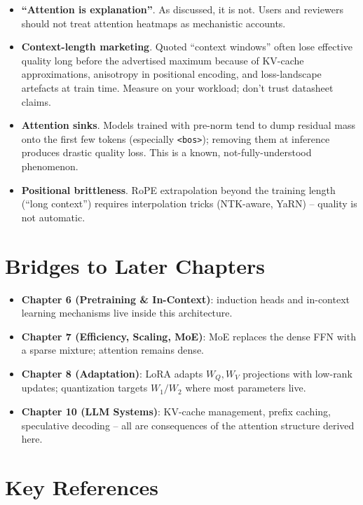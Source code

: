 \begin{itemize}
  \item \textbf{``Attention is explanation''}. As discussed, it is
        not. Users and reviewers should not treat attention heatmaps
        as mechanistic accounts.
  \item \textbf{Context-length marketing}. Quoted ``context windows''
        often lose effective quality long before the advertised
        maximum because of KV-cache approximations, anisotropy in
        positional encoding, and loss-landscape artefacts at train
        time. Measure on your workload; don't trust datasheet claims.
  \item \textbf{Attention sinks}. Models trained with pre-norm tend
        to dump residual mass onto the first few tokens (especially
        \texttt{<bos>}); removing them at inference produces drastic
        quality loss. This is a known, not-fully-understood phenomenon.
  \item \textbf{Positional brittleness}. RoPE extrapolation beyond the
        training length (``long context'') requires interpolation
        tricks (NTK-aware, YaRN) -- quality is not automatic.
\end{itemize}

\section{Bridges to Later Chapters}

\begin{itemize}
  \item \textbf{Chapter 6 (Pretraining \& In-Context)}: induction heads
        and in-context learning mechanisms
        \citep{olsson2022induction, xie2022explanation} live inside
        this architecture.
  \item \textbf{Chapter 7 (Efficiency, Scaling, MoE)}: MoE replaces the
        dense FFN with a sparse mixture; attention remains dense.
  \item \textbf{Chapter 8 (Adaptation)}: LoRA adapts $W_Q, W_V$ projections
        with low-rank updates; quantization targets $W_1/W_2$ where
        most parameters live.
  \item \textbf{Chapter 10 (LLM Systems)}: KV-cache management, prefix
        caching, speculative decoding -- all are consequences of the
        attention structure derived here.
\end{itemize}

\section{Key References}

